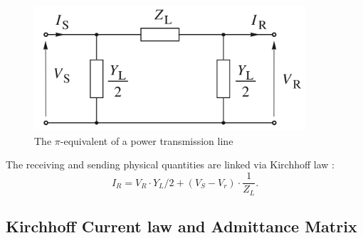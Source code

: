 \begin{figure}
    \centering
    \includegraphics[width=0.9\textwidth]{Dissertation/images/pi_model.PNG}
    \caption{The $\pi$-equivalent of a power transmission line}
    \label{fig:pi_model}
\end{figure}

The receiving and sending physical quantities are linked via Kirchhoff law \cite{kirchhoff1847ueber}: 
$$
I_R = V_R \cdot Y_L/2 + (V_S - V_r) \cdot \frac{1}{Z_L}.
$$

\subsection{Kirchhoff Current law and Admittance Matrix}

